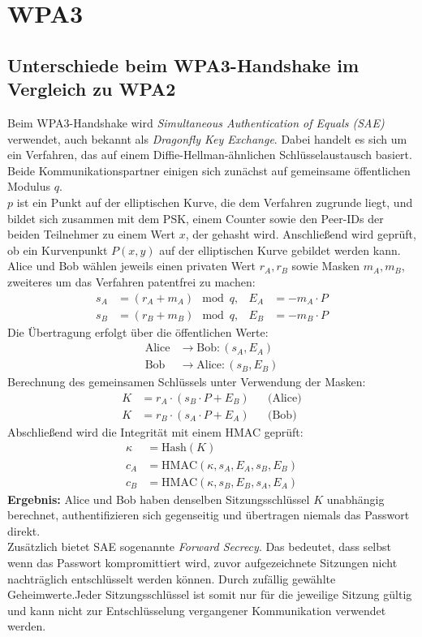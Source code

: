\section{WPA3}
\subsection{Unterschiede beim WPA3-Handshake im Vergleich zu WPA2}
Beim WPA3-Handshake wird \textit{Simultaneous Authentication of Equals (SAE)} verwendet, auch bekannt als \textit{Dragonfly Key Exchange}.
Dabei handelt es sich um ein Verfahren, das auf einem Diffie-Hellman-ähnlichen Schlüsselaustausch basiert. Beide Kommunikationspartner einigen sich zunächst auf gemeinsame öffentlichen Modulus $q$.\\
$p$ ist ein Punkt auf der elliptischen Kurve, die dem Verfahren zugrunde liegt, und bildet sich zusammen mit dem PSK, einem Counter sowie den Peer-IDs der beiden Teilnehmer zu einem Wert $x$, der gehasht wird. Anschließend wird geprüft, ob ein Kurvenpunkt $P(x,y)$ auf der elliptischen Kurve gebildet werden kann.
\\
Alice und Bob wählen jeweils einen privaten Wert $r_A, r_B$ sowie Masken $m_A, m_B$, zweiteres um das Verfahren patentfrei zu machen:
\begin{align*}
s_A &= (r_A + m_A) \mod q, & E_A &= - m_A \cdot P \\
s_B &= (r_B + m_B) \mod q, & E_B &= - m_B \cdot P
\end{align*}
Die Übertragung erfolgt über die öffentlichen Werte:
\begin{align*}
\text{Alice} &\rightarrow \text{Bob}: (s_A, E_A) \\
\text{Bob} &\rightarrow \text{Alice}: (s_B, E_B)
\end{align*}
Berechnung des gemeinsamen Schlüssels unter Verwendung der Masken:
\begin{align*}
K &= r_A \cdot (s_B \cdot P + E_B) && \text{(Alice)} \\
K &= r_B \cdot (s_A \cdot P + E_A) && \text{(Bob)}
\end{align*}
Abschließend wird die Integrität mit einem HMAC geprüft:
\begin{align*}
\kappa &= \text{Hash}(K) \\
c_A &= \text{HMAC}(\kappa, s_A, E_A, s_B, E_B) \\
c_B &= \text{HMAC}(\kappa, s_B, E_B, s_A, E_A)
\end{align*}
\textbf{Ergebnis:} Alice und Bob haben denselben Sitzungsschlüssel $K$ unabhängig berechnet, authentifizieren sich gegenseitig und übertragen niemals das Passwort direkt.\\
Zusätzlich bietet SAE sogenannte \textit{Forward Secrecy}. Das bedeutet, dass selbst wenn das Passwort kompromittiert wird, zuvor aufgezeichnete Sitzungen nicht nachträglich entschlüsselt werden können. Durch zufällig gewählte Geheimwerte.Jeder Sitzungsschlüssel ist somit nur für die jeweilige Sitzung gültig und kann nicht zur Entschlüsselung vergangener Kommunikation verwendet werden.\\

